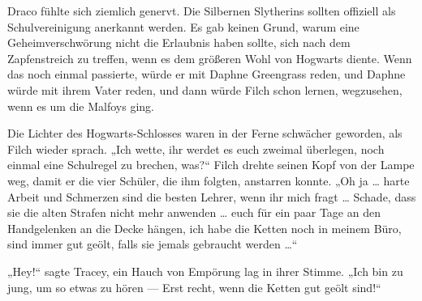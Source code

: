 Draco fühlte sich ziemlich genervt. Die Silbernen Slytherins sollten offiziell als Schulvereinigung anerkannt werden. Es gab keinen Grund, warum eine Geheimverschwörung nicht die Erlaubnis haben sollte, sich nach dem Zapfenstreich zu treffen, wenn es dem größeren Wohl von Hogwarts diente. Wenn das noch einmal passierte, würde er mit Daphne Greengrass reden, und Daphne würde mit ihrem Vater reden, und dann würde Filch schon lernen, wegzusehen, wenn es um die Malfoys ging.

Die Lichter des Hogwarts-Schlosses waren in der Ferne schwächer geworden, als Filch wieder sprach.
„Ich wette, ihr werdet es euch zweimal überlegen, noch einmal eine Schulregel zu brechen, was?“ Filch drehte seinen Kopf von der Lampe weg, damit er die vier Schüler, die ihm folgten, anstarren konnte.
„Oh ja … harte Arbeit und Schmerzen sind die besten Lehrer, wenn ihr mich fragt … Schade, dass sie die alten Strafen nicht mehr anwenden … euch für ein paar Tage an den Handgelenken an die Decke hängen, ich habe die Ketten noch in meinem Büro, sind immer gut geölt, falls sie jemals gebraucht werden …“

„Hey!“ sagte Tracey, ein Hauch von Empörung lag in ihrer Stimme.
„Ich bin zu jung, um so etwas zu hören — Erst recht, wenn die Ketten gut geölt sind!“

